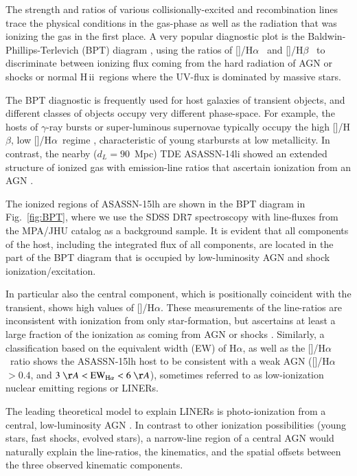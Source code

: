 \documentclass[traditabstract]{aa}
\newcommand{\hb}{H$\beta$}
\newcommand{\ha}{H$\alpha$}
\newcommand{\hii}{\mbox{H\,{\sc ii}}}
\newcommand{\oiii}{[\ion{O}{iii}]}
\newcommand{\nii}{[\ion{N}{ii}]}
\begin{document}
The strength and ratios of various collisionally-excited and recombination lines trace the physical conditions in the gas-phase as well as the radiation that was ionizing the gas in the first place. A very popular diagnostic plot is the Baldwin-Phillips-Terlevich (BPT) diagram \citep{1981PASP...93....5B}, using the ratios of \nii/\ha~ and \oiii/\hb~ to discriminate between ionizing flux coming from the hard radiation of AGN or shocks or normal \hii~regions where the UV-flux is dominated by massive stars. 

The BPT diagnostic is frequently used for host galaxies of transient objects, and different classes of objects occupy very different phase-space. For example, the hosts of $\gamma$-ray bursts or super-luminous supernovae typically occupy the high \oiii/\hb, low \nii/\ha~regime \citep{2015A&A...581A.125K, 2015MNRAS.449..917L}, characteristic of young starbursts at low metallicity. In contrast, the nearby ($d_L=90$~Mpc) TDE ASASSN-14li \citep{2016MNRAS.455.2918H} showed an extended structure of ionized gas with emission-line ratios that ascertain ionization from an AGN \citep{2016ApJ...830L..32P}.

The ionized regions of ASASSN-15lh are shown in the BPT diagram in Fig.~\ref{fig:BPT}, where we use the SDSS DR7 spectroscopy \citep{2009ApJS..182..543A} with line-fluxes from the MPA/JHU catalog as a background sample. It is evident that all components of the host, including the integrated flux of all components, are located in the part of the BPT diagram that is occupied by low-luminosity AGN and shock ionization/excitation.

In particular also the central component, which is positionally coincident with the transient, shows high values of \nii/\ha. These measurements of the line-ratios are inconsistent with ionization from only star-formation, but ascertains at least a large fraction of the ionization as coming from AGN or shocks \citep{2011MNRAS.413.1687C}. Similarly, a classification based on the equivalent width (EW) of \ha, as well as the \nii/\ha~ratio \citep{2011MNRAS.413.1687C} shows the ASASSN-15lh host to be consistent with a weak AGN (\nii/\ha~$>0.4$, and $3~\AA < \mathrm{EW}_{\mathrm{H}\alpha} < 6~\AA$), sometimes referred to as low-ionization nuclear emitting regions or LINERs.

The leading theoretical model to explain LINERs is photo-ionization from a central, low-luminosity AGN \citep[e.g.,][for a review]{2008ARA&A..46..475H}. In contrast to other ionization possibilities (young stars, fast shocks, evolved stars), a narrow-line region of a central AGN would naturally explain the line-ratios, the kinematics, and the spatial offsets between the three observed kinematic components.
\end{document}
